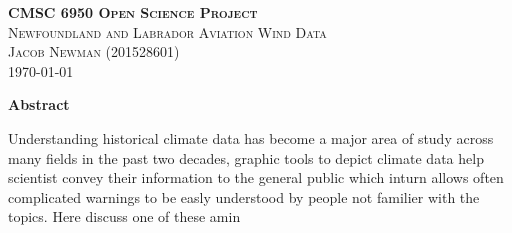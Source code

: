 \documentclass{article}
\begin{document}
\begin{titlepage}
\newcommand{\HRule}{\rule{\linewidth}{0.5mm}}

\center
\textsc{\LARGE \textbf{CMSC 6950 Open Science Project}}\\[1 cm]

\textsc{\Large Newfoundland and Labrador Aviation Wind Data}\\[0.5 cm]

\textsc{\large Jacob Newman (201528601)}\\[0.5 cm]





\vfill\vfill\vfill
{\large\today}
\vfill

\end{titlepage}

\begin{center}
\bf{Abstract}

Understanding historical climate data has become a major area of study across many fields in the past two decades, graphic tools to depict climate data help scientist convey their information to the 
general public which inturn allows often complicated warnings to be easly understood by people not familier with the topics. Here discuss one of these amin

\end{center}
\end{document}
